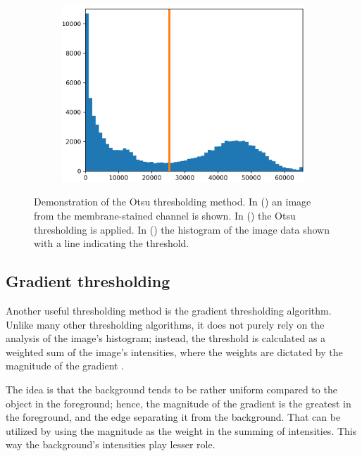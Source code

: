 \documentclass[
  digital,     %
  oneside,     %
  nosansbold,  %
  nocolorbold, %
  lof,         %
  lot,         %
]{fithesis4}
\begin{document}
\begin{figure}
\begin{subfigure}[t]{0.45\textwidth}
        \caption{}
        \label{fig:otsu-thresholded}
    \end{subfigure}
    \begin{subfigure}[t]{0.6\textwidth}
        \centering
        \includegraphics[width=\textwidth]{resources/otsu-histogram.png}
        \caption{}
        \label{fig:otsu-histogram}
    \end{subfigure}
    \caption{Demonstration of the Otsu thresholding method. In () an image from the membrane-stained channel is shown. In () the Otsu thresholding is applied. In () the histogram of the image data shown with a line indicating the threshold.}
    \label{fig:otsu-demonstration}
\end{figure}


\subsection{Gradient thresholding}

Another useful thresholding method is the gradient thresholding algorithm. Unlike
many other thresholding algorithms, it does not purely rely on the analysis of
the image's histogram; instead, the threshold is calculated as a weighted sum of
the image's intensities, where the weights are dictated by the magnitude of the
gradient \cite{pb130}.

The idea is that the background tends to be rather uniform compared to the
object in the foreground; hence, the magnitude of the gradient is the greatest
in the foreground, and the edge separating it from the background. That can be
utilized by using the magnitude as the weight in the summing of intensities.
This way the background's intensities play lesser role.
\end{document}
